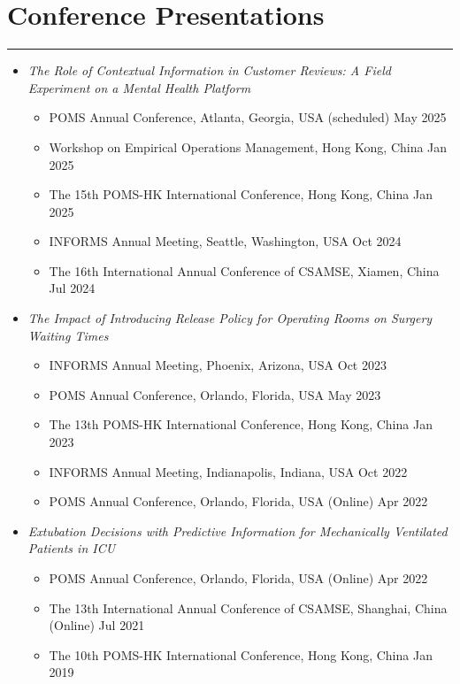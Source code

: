 \documentclass[12pt, a4paper]{article}
\begin{document}
{\section*{Conference Presentations}
\vspace*{4pt}
\hrule

\begin{itemize}[leftmargin=14pt]

	\item[] {\it The Role of Contextual Information in Customer Reviews: A Field Experiment on a Mental Health Platform}
	\begin{itemize}[label=$\bullet$]
		\item POMS Annual Conference, Atlanta, Georgia, USA (scheduled) \hfill May 2025
		\item Workshop on Empirical Operations Management, Hong Kong, China \hfill Jan 2025
		\item The 15th POMS-HK International Conference, Hong Kong, China \hfill Jan 2025
		\item INFORMS Annual Meeting, Seattle, Washington, USA \hfill Oct 2024
		\item The 16th International Annual Conference of CSAMSE, Xiamen, China \hfill Jul 2024
	\end{itemize}

	\item[] {\it The Impact of Introducing Release Policy for Operating Rooms on Surgery Waiting Times}
	\begin{itemize}[label=$\bullet$]
		\item INFORMS Annual Meeting, Phoenix, Arizona, USA \hfill Oct 2023
		\item POMS Annual Conference, Orlando, Florida, USA \hfill May 2023
		\item The 13th POMS-HK International Conference, Hong Kong, China \hfill Jan 2023
		\item INFORMS Annual Meeting, Indianapolis, Indiana, USA \hfill Oct 2022
		\item POMS Annual Conference, Orlando, Florida, USA (Online) \hfill Apr 2022
	\end{itemize}

	\item[] {\it Extubation Decisions with Predictive Information for Mechanically Ventilated Patients in ICU}
	\begin{itemize}[label=$\bullet$]
		\item POMS Annual Conference, Orlando, Florida, USA (Online) \hfill Apr 2022
		\item The 13th International Annual Conference of CSAMSE, Shanghai, China (Online) \hfill Jul 2021
		\item The 10th POMS-HK International Conference, Hong Kong, China \hfill Jan 2019
	\end{itemize}


\end{itemize}}
\end{document}
